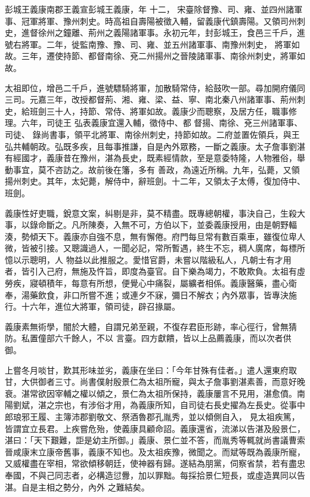
\begin{pinyinscope}

 彭城王義康南郡王義宣彭城王義康，年
 十二，
 宋臺除督豫、司、雍、並四州諸軍事、冠軍將軍、豫州刺史。時高祖自壽陽被徵入輔，留義康代鎮壽陽。又領司州刺史，進督徐州之鐘離、荊州之義陽諸軍事。永初元年，封彭城王，食邑三千戶，進號右將軍。二年，徙監南豫、豫、司、雍、並五州諸軍事、南豫州刺史，
 將軍如故。三年，遷使持節、都督南徐、兗二州揚州之晉陵諸軍事、南徐州刺史，將軍如故。



 太祖即位，增邑二千戶，進號驃騎將軍，加散騎常侍，給鼓吹一部。尋加開府儀同三司。元嘉三年，改授都督荊、湘、雍、梁、益、寧、南北秦八州諸軍事、荊州刺史，給班劍三十人，持節、常侍、將軍如故。義康少而聰察，及居方任，職事修理。六年，司徒王
 弘表義康宜還入輔，徵侍中、都
 督揚、南徐、兗三州諸軍事、
 司徒、
 錄尚書事，領平北將軍、南徐州刺史，持節如故。二府並置佐領兵，與王弘共輔朝政。弘既多疾，且每事推謙，自是內外眾務，一斷之義康。太子詹事劉湛有經國才，義康昔在豫州，湛為長史，既素經情款，至是意委特隆，人物雅俗，舉動事宜，莫不咨訪之。故前後在籓，多有
 善政，為遠近所稱。九年，弘薨，又領揚州刺史。其年，太妃薨，解侍中，辭班劍。十二年，又領太子太傅，復加侍中、班劍。



 義康性好吏職，銳意文案，糾剔是非，莫不精盡。既專總朝權，事決自己，生殺大事，以錄命斷之。凡所陳奏，入無不可，方伯以下，並委義康授用，由是朝野輻湊，勢傾天下。義康亦自強不息，無有懈倦。府門每旦常有數百乘車，雖復位卑人微，皆被引接。又聰識過人，一聞必記，常所暫遇，終生不忘，稠人廣席，每標所憶以示聰明，人
 物益以此推服之。愛惜官爵，未嘗以階級私人，凡朝士有才用者，皆引入己府，無施及忤旨，即度為臺官。自下樂為竭力，不敢欺負。太祖有虛勞疾，寢頓積年，每意有所想，便覺心中痛裂，屬纊者相係。義康醫藥，盡心衛奉，湯藥飲食，非口所嘗不進；或連夕不寐，彌日不解衣；內外眾事，皆專決施行。十六年，進位大將軍，領司徒，辟召掾屬。



 義康素無術學，闇於大體，自謂兄弟至親，不復存君臣形跡，率心徑行，曾無猜防。私置僮部六千餘人，不以
 言臺。四方獻饋，皆以上品薦義康，而以次者供御。



 上嘗冬月啖甘，歎其形味並劣，義康在坐曰：「今年甘殊有佳者。」遣人還東府取甘，大供御者三寸。尚書僕射殷景仁為太祖所寵，與太子詹事劉湛素善，而意好晚衰。湛常欲因宰輔之權以傾之，景仁為太祖所保持，義康屢言不見用，湛愈僨。南陽劉斌，湛之宗也，有涉俗才用，為義康所知，自司徒右長史擢為左長史。從事中郎琅邪王履、主簿沛郡劉敬文、祭酒魯郡孔胤秀，並以傾側自入，
 見太祖疾篤，皆謂宜立長君。上疾嘗危殆，使義康具顧命詔。義康還省，流涕以告湛及殷景仁，湛曰：「天下艱難，詎是幼主所御。」義康、景仁並不答，而胤秀等輒就尚書議曹索晉咸康末立康帝舊事，義康不知也。及太祖疾豫，微聞之。而斌等既為義康所寵，又威權盡在宰相，常欲傾移朝廷，使神器有歸。遂結為朋黨，伺察省禁，若有盡忠奉國，不與己同志者，必構造愆釁，加以罪黜。每採拾景仁短長，或虛造異同以告湛。自是主相之勢分，內外
 之難結矣。




\end{pinyinscope}

